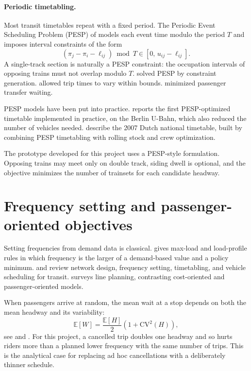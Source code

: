\documentclass[11pt]{article}
\begin{document}
\paragraph{Periodic timetabling.}
Most transit timetables repeat with a fixed period. The Periodic Event Scheduling Problem (PESP) of \citet{serafini1989mathematical} models each event time modulo the period $T$ and imposes interval constraints of the form
\[
  (\pi_j - \pi_i - \ell_{ij}) \bmod T \in [0,\, u_{ij} - \ell_{ij}].
\]
A single-track section is naturally a PESP constraint: the occupation intervals of opposing trains must not overlap modulo $T$. \citet{odijk1996constraint} solved PESP by constraint generation. \citet{kroon2003variable} allowed trip times to vary within bounds. \citet{nachtigall1997minimizing} minimized passenger transfer waiting.

PESP models have been put into practice. \citet{liebchen2008first} reports the first PESP-optimized timetable implemented in practice, on the Berlin U-Bahn, which also reduced the number of vehicles needed. \citet{kroon2009new} describe the 2007 Dutch national timetable, built by combining PESP timetabling with rolling stock and crew optimization.

The prototype developed for this project uses a PESP-style formulation. Opposing trains may meet only on double track, siding dwell is optional, and the objective minimizes the number of trainsets for each candidate headway.

\section{Frequency setting and passenger-oriented objectives}

Setting frequencies from demand data is classical. \citet{ceder1984bus} gives max-load and load-profile rules in which frequency is the larger of a demand-based value and a policy minimum. \citet{guihaire2008transit} and \citet{ibarrarojas2015planning} review network design, frequency setting, timetabling, and vehicle scheduling for transit. \citet{schobel2012line} surveys line planning, contrasting cost-oriented and passenger-oriented models.

When passengers arrive at random, the mean wait at a stop depends on both the mean headway and its variability:
\[
  \mathbb{E}[W] = \frac{\mathbb{E}[H]}{2}\left(1 + \mathrm{CV}^2(H)\right),
\]
see \citet{welding1957instability} and \citet{osuna1972control}. For this project, a cancelled trip doubles one headway and so hurts riders more than a planned lower frequency with the same number of trips. This is the analytical case for replacing ad hoc cancellations with a deliberately thinner schedule.
\end{document}

